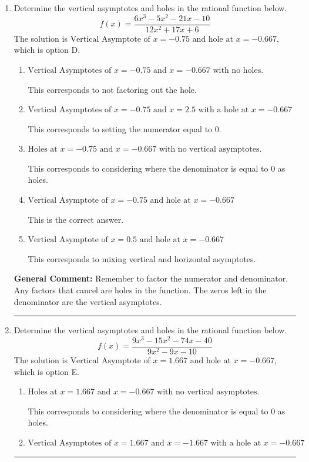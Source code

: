 \documentclass{extbook}[14pt]
\newcommand{\litem}[1]{\item #1

\rule{\textwidth}{0.4pt}}
\begin{document}
\begin{enumerate}\litem{
Determine the vertical asymptotes and holes in the rational function below.
\[ f(x) = \frac{6x^{3} -5 x^{2} -21 x -10}{12x^{2} +17 x + 6} \]The solution is \( \text{Vertical Asymptote of } x = -0.75 \text{ and hole at } x = -0.667 \), which is option D.\begin{enumerate}[label=\Alph*.]
\item \( \text{Vertical Asymptotes of } x = -0.75 \text{ and } x = -0.667 \text{ with no holes.} \)

This corresponds to not factoring out the hole.
\item \( \text{Vertical Asymptotes of } x = -0.75 \text{ and } x = 2.5 \text{ with a hole at } x = -0.667 \)

This corresponds to setting the numerator equal to 0.
\item \( \text{Holes at } x = -0.75 \text{ and } x = -0.667 \text{ with no vertical asymptotes.} \)

This corresponds to considering where the denominator is equal to 0 as holes.
\item \( \text{Vertical Asymptote of } x = -0.75 \text{ and hole at } x = -0.667 \)

This is the correct answer.
\item \( \text{Vertical Asymptote of } x = 0.5 \text{ and hole at } x = -0.667 \)

This corresponds to mixing vertical and horizontal asymptotes.
\end{enumerate}

\textbf{General Comment:} Remember to factor the numerator and denominator. Any factors that cancel are holes in the function. The zeros left in the denominator are the vertical asymptotes.
}
\litem{
Determine the vertical asymptotes and holes in the rational function below.
\[ f(x) = \frac{9x^{3} -15 x^{2} -74 x -40}{9x^{2} -9 x -10} \]The solution is \( \text{Vertical Asymptote of } x = 1.667 \text{ and hole at } x = -0.667 \), which is option E.\begin{enumerate}[label=\Alph*.]
\item \( \text{Holes at } x = 1.667 \text{ and } x = -0.667 \text{ with no vertical asymptotes.} \)

This corresponds to considering where the denominator is equal to 0 as holes.
\item \( \text{Vertical Asymptotes of } x = 1.667 \text{ and } x = -1.667 \text{ with a hole at } x = -0.667 \)


\end{enumerate}}
\end{enumerate}
\end{document}
